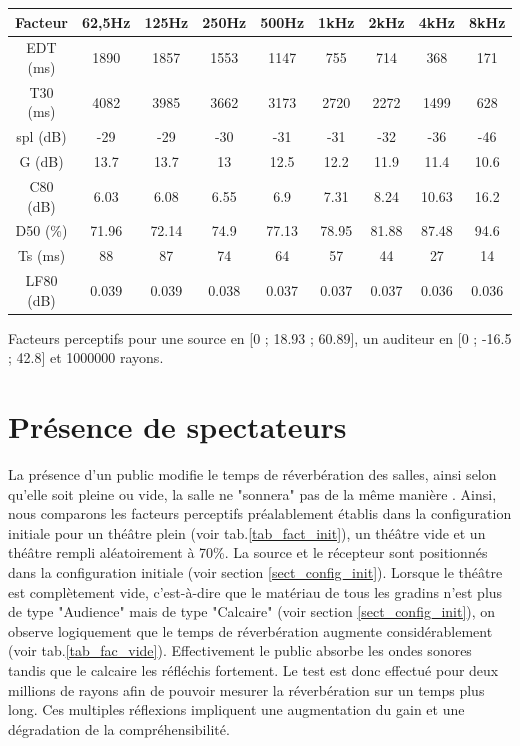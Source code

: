 \begin{tableth} 
 \begin{tabular}{| *{9}{c|}} 
 \hline 
 Facteur & 62,5Hz & 125Hz & 250Hz & 500Hz & 1kHz & 2kHz & 4kHz & 8kHz \\ 
 \hline 
 \hline 
\gls{EDT} (ms)& 1890& 1857& 1553& 1147& 755& 714& 368& 171 \\ 
 \hline 
\gls{T30} (ms)& 4082& 3985& 3662& 3173& 2720& 2272& 1499& 628 \\ 
 \hline 
\gls{spl} (dB)& -29& -29& -30& -31& -31& -32& -36& -46 \\ 
 \hline 
\gls{G} (dB)& 13.7& 13.7& 13& 12.5& 12.2& 11.9& 11.4& 10.6 \\ 
 \hline 
\gls{C80} (dB)& 6.03& 6.08& 6.55& 6.9& 7.31& 8.24& 10.63& 16.2 \\ 
 \hline 
\gls{D50} (\%)& 71.96& 72.14& 74.9& 77.13& 78.95& 81.88& 87.48& 94.6 \\ 
 \hline 
\gls{Ts} (ms)& 88& 87& 74& 64& 57& 44& 27& 14 \\ 
 \hline 
\gls{LF80} (dB)& 0.039& 0.039& 0.038& 0.037& 0.037& 0.037& 0.036& 0.036 \\ 
 \hline 
\end{tabular} 
 \caption{Facteurs perceptifs pour une source en [0 ; 18.93 ; 60.89], un auditeur en [0 ; -16.5 ; 42.8] et 1000000 rayons.} 
 \label{tab_niche} 
 \end{tableth}




\section{Présence de spectateurs}
La présence d'un public modifie le temps de réverbération des salles, ainsi selon qu'elle soit pleine ou vide, la salle ne "sonnera" pas de la même manière \cite[p.212]{jouhaneau}. Ainsi, nous comparons les facteurs perceptifs préalablement établis dans la configuration initiale pour un théâtre plein (voir tab.\ref{tab_fact_init}), un théâtre vide et un théâtre rempli aléatoirement à 70\%. La source et le récepteur sont positionnés dans la configuration initiale (voir section \ref{sect_config_init}). Lorsque le théâtre est complètement vide, c'est-à-dire que le matériau de tous les gradins n'est plus de type "Audience" mais de type "Calcaire" (voir section \ref{sect_config_init}), on observe logiquement que le temps de réverbération augmente considérablement (voir tab.\ref{tab_fac_vide}). Effectivement le public absorbe les ondes sonores tandis que le calcaire les réfléchis fortement. Le test est donc effectué pour deux millions de rayons afin de pouvoir mesurer la réverbération sur un temps plus long. Ces multiples réflexions impliquent une augmentation du gain et une dégradation de la compréhensibilité.

